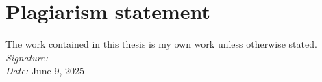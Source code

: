 \thispagestyle{empty}
\section*{Plagiarism statement}
The work contained in this thesis is my own work unless otherwise stated. \\

\vspace{1em}
\noindent \textit{Signature:} \reportauthor \\
\textit{Date:} June 9, 2025  %
